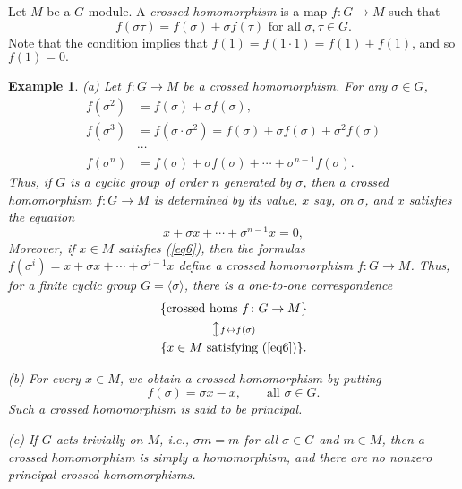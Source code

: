 \documentclass[a4paper,11pt,final,openany]{memoir}
\newtheorem{example}[X]{Example}
\theoremstyle{nonumberplain}
\begin{document}
Let $M$ be a $G$-module. A \emph{crossed homomorphism\/}%
is a map $f\colon G\rightarrow M$ such that
\[
f(\sigma\tau)=f(\sigma)+\sigma f(\tau)\text{ for all }\sigma,\tau\in G\text{.}%
\]
Note that the condition implies that $f(1)=f(1\cdot1)=f(1)+f(1)$, and so
$f(1)=0.$

\begin{example}
\label{ag16} (a) Let $f\colon G\rightarrow M$ be a crossed homomorphism. For
any $\sigma\in G$,
\begin{align*}
f(\sigma^{2})  &  =f(\sigma)+\sigma f(\sigma),\\
f(\sigma^{3})  &  =f(\sigma\cdot\sigma^{2})=f(\sigma)+\sigma f(\sigma
)+\sigma^{2}f(\sigma)\\
&  \cdots\\
f(\sigma^{n})  &  =f(\sigma)+\sigma f(\sigma)+\cdots+\sigma^{n-1}f(\sigma).
\end{align*}
Thus, if $G$ is a cyclic group of order $n$ generated by $\sigma$, then a
crossed homomorphism $f\colon G\rightarrow M$ is determined by its value, $x$
say, on $\sigma$, and $x$ satisfies the equation
\begin{equation}
x+\sigma x+\cdots+\sigma^{n-1}x=0, \label{eq6}%
\end{equation}
Moreover, if $x\in M$ satisfies (\ref{eq6}), then the formulas $f(\sigma
^{i})=x+\sigma x+\cdots+\sigma^{i-1}x$ define a crossed homomorphism $f\colon
G\rightarrow M$. Thus, for a finite cyclic group $G=\langle\sigma\rangle$,
there is a one-to-one correspondence
\begin{gather*}
\{\text{crossed homs }f\colon G\rightarrow M\}\\
\big\updownarrow {\scriptstyle f\leftrightarrow
f(\sigma)}\\
\{x\in M\text{\ satisfying (\ref{eq6})}\}.
\end{gather*}


(b) For every $x\in M$, we obtain a crossed homomorphism by putting
\[
f(\sigma)=\sigma x-x,\qquad\text{all }\sigma\in G.
\]
Such a crossed homomorphism is said to be \emph{principal}.
%


(c) If $G$ acts trivially on $M$, i.e., $\sigma m=m$ for all $\sigma\in G$ and
$m\in M$, then a crossed homomorphism is simply a homomorphism, and there are
no nonzero principal crossed homomorphisms.
\end{example}
\end{document}
